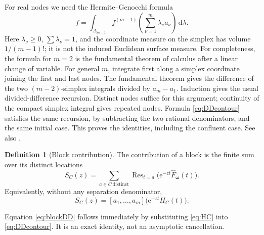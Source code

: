 \documentclass[11pt,a4paper]{article}
\numberwithin{equation}{section}
\theoremstyle{definition}
\newtheorem{definition}[theorem]{Definition}
\theoremstyle{remark}
\newcommand{\e}{\mathrm e}
\newcommand{\dd}{\,\mathrm d}
\newcommand{\Res}{\operatorname{Res}}
\newcommand{\bw}{\boldsymbol\omega}
\begin{document}
For real nodes we need the Hermite--Genocchi formula
\begin{equation}
 [a_1,\ldots,a_m]f
 =\int_{\Delta_{m-1}}f^{(m-1)}\!\left(\sum_{\nu=1}^m
                 \lambda_\nu a_\nu\right)\dd\lambda.
 \label{eq:HG}
\end{equation}
Here $\lambda_\nu\ge0$, $\sum\lambda_\nu=1$, and the coordinate measure
on the simplex has volume $1/(m-1)!$; it is not the induced Euclidean
surface measure. For completeness, the formula for $m=2$ is the
fundamental theorem of calculus after a linear change of variable.
For general $m$, integrate first along a simplex coordinate joining the
first and last nodes. The fundamental theorem gives the difference of the
two $(m-2)$-simplex integrals divided by $a_m-a_1$. Induction gives the
usual divided-difference recursion. Distinct nodes suffice for this
argument; continuity of the compact simplex integral gives repeated nodes.
Formula \eqref{eq:DDcontour} satisfies the same recursion, by subtracting
the two rational denominators, and the same initial case. This proves the
identities, including the confluent case. See also \cite{deboor}.

\begin{definition}[Block contribution]
The contribution of a block is the finite sum over its distinct locations
\begin{equation}
 S_C(z)=\sum_{a\in C\ \mathrm{distinct}}
            \Res_{t=a}\bigl(\e^{-zt}\widehat F_{\bw}(t)\bigr).
 \label{eq:blockdef}
\end{equation}
Equivalently, without any separation denominator,
\begin{equation}
 S_C(z)=[a_1,\ldots,a_m]\bigl(\e^{-zt}H_C(t)\bigr).
 \label{eq:blockDD}
\end{equation}
\end{definition}
Equation \eqref{eq:blockDD} follows immediately by substituting
\eqref{eq:HC} into \eqref{eq:DDcontour}. It is an exact identity, not an
asymptotic cancellation.
\end{document}
